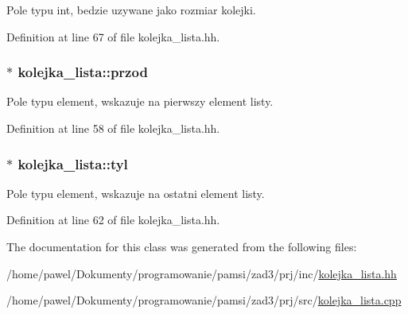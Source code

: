 Pole typu int, bedzie uzywane jako rozmiar kolejki. 



Definition at line 67 of file kolejka\-\_\-lista.\-hh.

\hypertarget{classkolejka__lista_aedc7846eba7725b49c3de16fa18ae33a}{
\subsubsection[{przod}]{$\ast$ kolejka\-\_\-lista\-::przod\hspace{0.3cm}{\ttfamily [private]}}}\label{classkolejka__lista_aedc7846eba7725b49c3de16fa18ae33a}


Pole typu element, wskazuje na pierwszy element listy. 



Definition at line 58 of file kolejka\-\_\-lista.\-hh.

\hypertarget{classkolejka__lista_a9675dc97e4a026b1556699024e24636e}{
\subsubsection[{tyl}]{$\ast$ kolejka\-\_\-lista\-::tyl\hspace{0.3cm}{\ttfamily [private]}}}\label{classkolejka__lista_a9675dc97e4a026b1556699024e24636e}


Pole typu element, wskazuje na ostatni element listy. 



Definition at line 62 of file kolejka\-\_\-lista.\-hh.



The documentation for this class was generated from the following files\-:\begin{DoxyCompactItemize}
\item 
/home/pawel/\-Dokumenty/programowanie/pamsi/zad3/prj/inc/\hyperlink{kolejka__lista_8hh}{kolejka\-\_\-lista.\-hh}\item 
/home/pawel/\-Dokumenty/programowanie/pamsi/zad3/prj/src/\hyperlink{kolejka__lista_8cpp}{kolejka\-\_\-lista.\-cpp}\end{DoxyCompactItemize}
